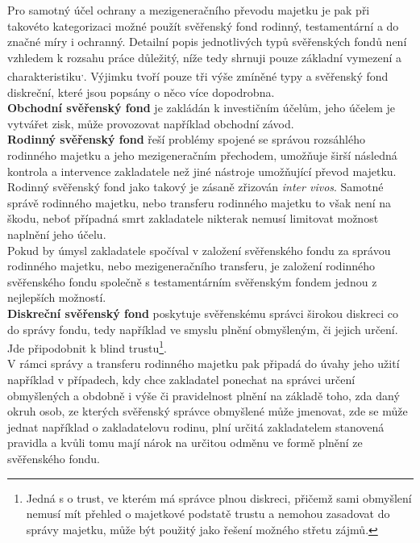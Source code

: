 \documentclass{article}
\begin{document}
Pro samotný účel ochrany a mezigeneračního převodu majetku je pak při takovéto kategorizaci možné použít svěřenský fond rodinný, testamentární a do značné míry i ochranný. Detailní popis jednotlivých typů svěřenských fondů není vzhledem k rozsahu práce důležitý, níže tedy shrnuji pouze základní vymezení a charakteristiku\textsuperscript{,}. Výjimku tvoří pouze tři výše zmíněné typy a svěřenský fond diskreční, které jsou popsány o něco více dopodrobna.\\

\textbf{Obchodní svěřenský fond} je zakládán k investičním účelům, jeho účelem je vytvářet zisk, může provozovat například obchodní závod.\\

\textbf{Rodinný svěřenský fond} řeší problémy spojené se správou rozsáhlého rodinného majetku a jeho mezigeneračním přechodem, umožňuje širší následná kontrola a intervence zakladatele než jiné nástroje umožňující převod majetku.\\

Rodinný svěřenský fond jako takový je zásaně zřizován \textit{inter vivos}. Samotné správě rodinného majetku, nebo transferu rodinného majetku to však není na škodu, neboť případná smrt zakladatele nikterak nemusí limitovat možnost naplnění jeho účelu.\\

Pokud by úmysl zakladatele spočíval v založení svěřenského fondu za správou rodinného majetku, nebo mezigeneračního transferu, je založení rodinného svěřenského fondu společně s testamentárním svěřenským fondem jednou z nejlepších možností.\\

\textbf{Diskreční svěřenský fond} poskytuje svěřenskému správci širokou diskreci co do správy fondu, tedy například ve smyslu plnění obmyšleným, či jejich určení. Jde připodobnit k blind trustu\footnote{Jedná s o trust, ve kterém má správce plnou diskreci, přičemž sami obmyšlení nemusí mít přehled o majetkové podstatě trustu a nemohou zasadovat do správy majetku, může být použitý jako řešení možného střetu zájmů.}.\\

V rámci správy a transferu rodinného majetku pak připadá do úvahy jeho užití například v případech, kdy chce zakladatel ponechat na správci určení obmyšlených a obdobně i výše či pravidelnost plnění na základě toho, zda daný okruh osob, ze kterých svěřenský správce obmyšlené může jmenovat, zde se může jednat například o zakladatelovu rodinu, plní určitá zakladatelem stanovená pravidla a kvůli tomu mají nárok na určitou odměnu ve formě plnění ze svěřenského fondu.\\
\end{document}
